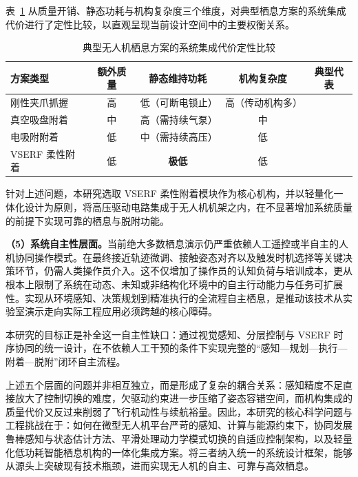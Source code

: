 表~\ref{tab:integration_tradeoff} 从质量开销、静态功耗与机构复杂度三个维度，对典型栖息方案的系统集成代价进行了定性比较，以直观呈现当前设计空间中的主要权衡关系。

\begin{table}[htbp]
\centering
\caption{典型无人机栖息方案的系统集成代价定性比较}
\label{tab:integration_tradeoff}
\renewcommand{\arraystretch}{1.3}
\begin{tabular}{lcccc}
\toprule
\textbf{方案类型} & \textbf{额外质量} & \textbf{静态维持功耗} & \textbf{机构复杂度} & \textbf{典型代表} \\
\midrule
刚性夹爪抓握   & 高   & 低（可断电锁止）  & 高（传动机构多） & \cite{hang2019perching} \\
真空吸盘附着   & 中   & 高（需持续气泵）  & 中               & \cite{ang2022drone}      \\
电吸附附着     & 低   & 中（需持续高压）  & 低               & \cite{park2020lightweight} \\
VSERF 柔性附着 & 低   & \textbf{极低} & 低          & \cite{pan2022stretchable} \\
\bottomrule
\end{tabular}
\end{table}

针对上述问题，本研究选取 VSERF 柔性附着模块作为核心机构，并以轻量化一体化设计为原则，将高压驱动电路集成于无人机机架之内，在不显著增加系统质量的前提下实现可靠的栖息与脱附功能。

\textbf{（5）系统自主性层面。}当前绝大多数栖息演示仍严重依赖人工遥控或半自主的人机协同操作模式。在最终接近轨迹微调、接触姿态对齐以及触发时机选择等关键决策环节，仍需人类操作员介入。这不仅增加了操作员的认知负荷与培训成本，更从根本上限制了系统在动态、未知或非结构化环境中的自主行动能力与任务可扩展性。实现从环境感知、决策规划到精准执行的全流程自主栖息，是推动该技术从实验室演示走向实际工程应用必须跨越的核心障碍。

本研究的目标正是补全这一自主性缺口：通过视觉感知、分层控制与 VSERF 时序协同的统一设计，在不依赖人工干预的条件下实现完整的“感知—规划—执行—附着—脱附”闭环自主流程。

上述五个层面的问题并非相互独立，而是形成了复杂的耦合关系：感知精度不足直接放大了控制切换的难度，欠驱动约束进一步压缩了姿态容错空间，而机构集成的质量代价又反过来削弱了飞行机动性与续航裕量。因此，本研究的核心科学问题与工程挑战在于：如何在微型无人机平台严苛的感知、计算与能源约束下，协同发展鲁棒感知与状态估计方法、平滑处理动力学模式切换的自适应控制架构，以及轻量化低功耗智能栖息机构的一体化集成方案。将三者纳入统一的系统设计框架，能够从源头上突破现有技术瓶颈，进而实现无人机的自主、可靠与高效栖息。

